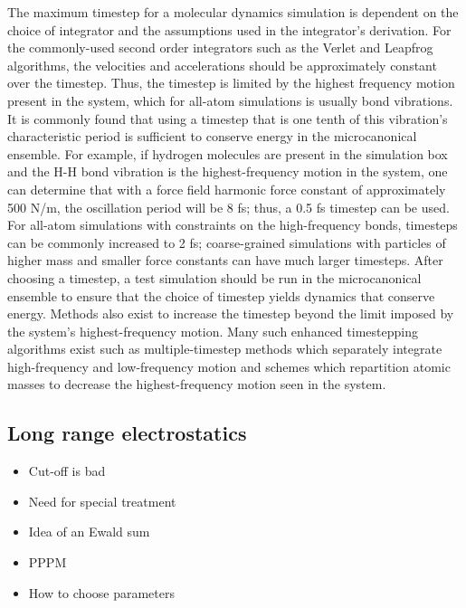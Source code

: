 \documentclass[9pt,bestpractices]{livecoms}
\begin{document}
The maximum timestep for a molecular dynamics simulation is dependent on the choice of integrator and the assumptions used in the integrator's derivation.
For the commonly-used second order integrators such as the Verlet and Leapfrog algorithms, the velocities and accelerations should be approximately constant over the timestep.
Thus, the timestep is limited by the highest frequency motion present in the system, which for all-atom simulations is usually bond vibrations.
It is commonly found that using a timestep that is one tenth of this vibration's characteristic period is sufficient to conserve energy in the microcanonical ensemble.
For example, if hydrogen molecules are present in the simulation box and the H-H bond vibration is the highest-frequency motion in the system, one can determine that with a force field harmonic force constant of approximately 500 N/m, the oscillation period will be 8 fs; thus, a 0.5 fs timestep can be used.
For all-atom simulations with constraints on the high-frequency bonds, timesteps can be commonly increased to 2 fs; coarse-grained simulations with particles of higher mass and smaller force constants can have much larger timesteps.
After choosing a timestep, a test simulation should be run in the microcanonical ensemble to ensure that the choice of timestep yields dynamics that conserve energy.
Methods also exist to increase the timestep beyond the limit imposed by the system's highest-frequency motion.
Many such enhanced timestepping algorithms exist such as multiple-timestep methods which separately integrate high-frequency and low-frequency motion and schemes which repartition atomic masses to decrease the highest-frequency motion seen in the system\cite{Berne:1999:Molecular,Hopkins:2015:JCTC:Long}.


\subsection{Long range electrostatics}
\label{sec:lr_electrostatics}
\begin{itemize}
\item Cut-off is bad
\item Need for special treatment
\item Idea of an Ewald sum
\item PPPM
\item How to choose parameters
\end{itemize}
\end{document}
